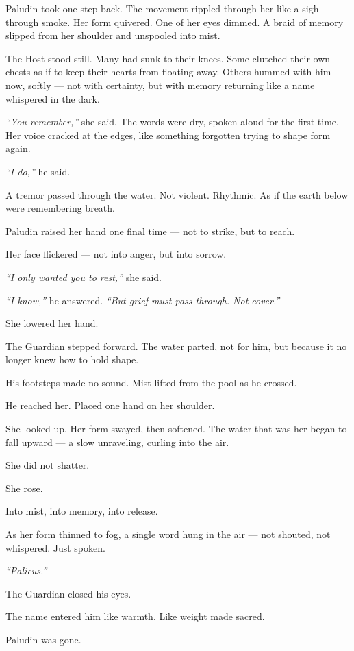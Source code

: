 \documentclass[12pt]{article}
\begin{document}
Paludin took one step back. The movement rippled through her like a sigh through smoke. Her form quivered. One of her eyes dimmed. A braid of memory slipped from her shoulder and unspooled into mist.

The Host stood still. Many had sunk to their knees. Some clutched their own chests as if to keep their hearts from floating away. Others hummed with him now, softly — not with certainty, but with memory returning like a name whispered in the dark.

\textit{``You remember,''} she said. The words were dry, spoken aloud for the first time. Her voice cracked at the edges, like something forgotten trying to shape form again.

\textit{``I do,''} he said.

A tremor passed through the water. Not violent. Rhythmic. As if the earth below were remembering breath.

Paludin raised her hand one final time — not to strike, but to reach.

Her face flickered — not into anger, but into sorrow.

\textit{``I only wanted you to rest,''} she said.

\textit{``I know,''} he answered. \textit{``But grief must pass through. Not cover.''}

She lowered her hand.

The Guardian stepped forward. The water parted, not for him, but because it no longer knew how to hold shape.

His footsteps made no sound. Mist lifted from the pool as he crossed.

He reached her. Placed one hand on her shoulder.

She looked up. Her form swayed, then softened. The water that was her began to fall upward — a slow unraveling, curling into the air.

She did not shatter.

She rose.

Into mist, into memory, into release.

As her form thinned to fog, a single word hung in the air — not shouted, not whispered. Just spoken.

\textit{``Palicus.''}

The Guardian closed his eyes.

The name entered him like warmth. Like weight made sacred.

Paludin was gone.
\end{document}
